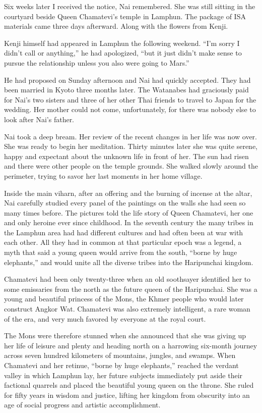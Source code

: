 \documentclass[]{article}
\begin{document}
{Six weeks later I received the notice, Nai remembered.  She was still sitting in the courtyard beside Queen Chamatevi’s temple in Lamphun.  The package of ISA materials came three days afterward.  Along with the flowers from Kenji.

Kenji himself had appeared in Lamphun the following weekend.  “I’m sorry I didn’t call or anything,” he had apologized, “but it just didn’t make sense to pursue the relationship unless you also were going to Mars.”

He had proposed on Sunday afternoon and Nai had quickly accepted.  They had been married in Kyoto three months later.  The Watanabes had graciously paid for Nai’s two sisters and three of her other Thai friends to travel to Japan for the wedding.  Her mother could not come, unfortunately, for there was nobody else to look after Nai’s father.

Nai took a deep bream.  Her review of the recent changes in her life was now over.  She was ready to begin her meditation.  Thirty minutes later she was quite serene, happy and expectant about the unknown life in front of her.  The sun had risen and there were other people on the temple grounds.  She walked slowly around the perimeter, trying to savor her last moments in her home village.

Inside the main viharn, after an offering and the burning of incense at the altar, Nai carefully studied every panel of the paintings on the walls she had seen so many times before.  The pictures told the life story of Queen Chamatevi, her one and only heroine ever since childhood.  In the seventh century the many tribes in the Lamphun area had had different cultures and had often been at war with each other.  All they had in common at that particular epoch was a legend, a myth that said a young queen would arrive from the south, “borne by huge elephants,” and would unite all the diverse tribes into the Haripunchai kingdom.

Chamatevi had been only twenty-three when an old soothsayer identified her to some emissaries from the north as the future queen of the Haripunchai.  She was a young and beautiful princess of the Mons, the Khmer people who would later construct Angkor Wat.  Chamatevi was also extremely intelligent, a rare woman of the era, and very much favored by everyone at the royal court.

The Mons were therefore stunned when she announced that she was giving up her life of leisure and plenty and heading north on a harrowing six-month journey across seven hundred kilometers of mountains, jungles, and swamps.  When Chamatevi and her retinue, “borne by huge elephants,” reached the verdant valley in which Lamphun lay, her future subjects immediately put aside their factional quarrels and placed the beautiful young queen on the throne.  She ruled for fifty years in wisdom and justice, lifting her kingdom from obscurity into an age of social progress and artistic accomplishment.

}
\end{document}
